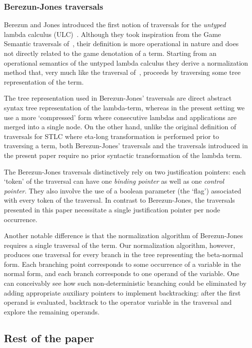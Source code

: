 \documentclass{article}
\theoremstyle{definition}
\begin{document}
\subsubsection{Berezun-Jones traversals}
Berezun and Jones  introduced the first notion of traversals for the \emph{untyped} lambda calculus (ULC)~\cite{JonesBerezunLLL}. Although they took inspiration from the Game Semantic traversals of~\cite{Ong2006,BlumGalop2008}, their definition is more operational in nature and does not directly related to the game denotation of a term. Starting from an operational semantics of the untyped lambda calculus they derive a normalization method that, very much like the traversal of~\cite{Ong2006, BlumPhd}, proceeds by traversing some tree representation of the term.

The tree representation used in Berezun-Jones' traversals are direct abstract syntax tree representation of the lambda-term, whereas in the present setting we use a more `compressed' form where consecutive lambdas and applications are merged into a single node. On the other hand, unlike the original definition of traversals for STLC where eta-long transformation is performed prior to traversing a term, both Berezun-Jones' traversals and the traversals introduced in the present paper require no prior syntactic transformation of the lambda term.

The Berezun-Jones traversals distinctively rely on two justification pointers: each `token' of the traversal can have one \emph{binding pointer} as well as one \emph{control pointer}. They also involve the use of a boolean parameter (the `flag') associated with every token of the traversal. In contrast to Berezun-Jones, the traversals presented in this paper necessitate a single justification pointer per node occurrence.

Another notable difference is that the normalization algorithm of Berezun-Jones requires a single traversal of the term. Our normalization algorithm, however, produces one traversal for every branch in the tree representing the beta-normal form. Each branching point corresponds to some occurrence of a variable in the normal form, and each branch corresponds to one operand of the variable. One can conceivably see how such non-deterministic branching could be eliminated by adding appropriate auxiliary pointers to implement backtracking: after the first operand is evaluated, backtrack to the operator variable in the traversal and explore the remaining operands.

\subsection{Rest of the paper}
\end{document}
